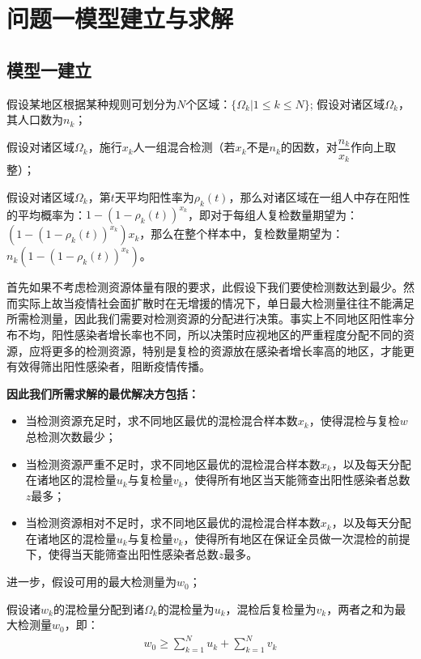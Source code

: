 \documentclass[withoutpreface,bwprint]{cumcmthesis} %
\begin{document}
\section{问题一模型建立与求解}

\subsection{模型一建立}
假设某地区根据某种规则可划分为$N$个区域：$\{\Omega_k \vert 1\leq k \leq N \}$;
假设对诸区域$\Omega_k$，其人口数为$n_k$；

假设对诸区域$\Omega_k$，施行$x_k$人一组混合检测（若$x_k$不是$n_k$的因数，对$\dfrac{n_k}{x_k}$作向上取整）；

假设对诸区域$\Omega_k$，第$t$天平均阳性率为$\rho_k(t)$，那么对诸区域在一组人中存在阳性的平均概率为：$1-(1-\rho_k(t))^{x_k}$，即对于每组人复检数量期望为：$(1-(1-\rho_k(t))^{x_k})x_k$，那么在整个样本中，复检数量期望为：$n_k(1-(1-\rho_k(t))^{x_k})$。

首先如果不考虑检测资源体量有限的要求，此假设下我们要使检测数达到最少。然而实际上故当疫情社会面扩散时在无增援的情况下，单日最大检测量往往不能满足所需检测量，因此我们需要对检测资源的分配进行决策。事实上不同地区阳性率分布不均，阳性感染者增长率也不同，所以决策时应视地区的严重程度分配不同的资源，应将更多的检测资源，特别是复检的资源放在感染者增长率高的地区，才能更有效得筛出阳性感染者，阻断疫情传播。

\textbf{因此我们所需求解的最优解决方包括：}
\begin{itemize}
    \item 当检测资源充足时，求不同地区最优的混检混合样本数$x_k$，使得混检与复检$w$总检测次数最少；
    \item 当检测资源严重不足时，求不同地区最优的混检混合样本数$x_k$，以及每天分配在诸地区的混检量$u_k$与复检量$v_k$，使得所有地区当天能筛查出阳性感染者总数$z$最多；
    \item 当检测资源相对不足时，求不同地区最优的混检混合样本数$x_k$，以及每天分配在诸地区的混检量$u_k$与复检量$v_k$，使得所有地区在保证全员做一次混检的前提下，使得当天能筛查出阳性感染者总数$z$最多。
\end{itemize}

进一步，假设可用的最大检测量为$w_0$；

假设诸$w_k$的混检量分配到诸$\Omega_k$的混检量为$u_{k}$，混检后复检量为$v_{k}$，两者之和为最大检测量$w_0$，即：
\begin{align}
    w_0 \geqslant \sum^N_{k=1} u_k +\sum^N_{k=1} v_k
\end{align}
\end{document}
